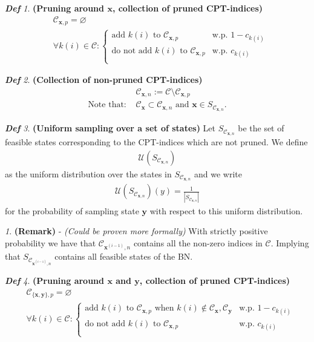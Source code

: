 \documentclass{amsart}
\theoremstyle{plain}
\theoremstyle{remark}
\newtheorem*{remark*}{}
\newtheorem*{definition*}{\textbf{\em Def}}
\theoremstyle{plain}
\newcommand{\C}{{\mathcal C}}
\newcommand{\U}{{\mathcal{U}}}
\newcommand{\bfx}{{\mathbf{x}}}
\newcommand{\bfy}{{\mathbf{y}}}
\let\emptyset\varnothing
\newcommand{\vs}{\vspace{0.75pc}}
\begin{document}
\begin{definition*}\textbf{ (Pruning around $\bfx$, collection of pruned CPT-indices) }
\begin{align*}
&\C_{\bfx,p} = \emptyset\\
& \forall k(i) \in \C:
\begin{cases}
\text{add $k(i)$ to $\C_{\bfx, p}$} & \text{w.p. $1-c_{k(i)}$}\\
\text{do not add $k(i)$ to $\C_{\bfx, p}$} & \text{w.p. $c_{k(i)}$}\\
\end{cases}
\end{align*}
\end{definition*}\vs 

\begin{definition*}\textbf{ (Collection of non-pruned CPT-indices) }
\begin{align*}
&\C_{\bfx,n}:=\C \setminus \C_{\bfx,p}\\
\text{Note that: } &\C_\bfx \subset \C_{\bfx,n} \text{ and } \bfx \in S_{\C_{\bfx,n}}.
\end{align*}
\end{definition*}\vs 

\begin{definition*}\textbf{ (Uniform sampling over a set of states) }
Let $S_{\C_{\bfx,n}}$ be the set of feasible states corresponding to the CPT-indices which are not pruned. We define
\begin{align*}
\U(S_{\C_{\bfx,n}})
\end{align*}
as the uniform distribution over the states in $S_{\C_{\bfx,n}}$ and we write
\begin{align*}
\U(S_{\C_{\bfx,n}})(y) = \frac{1}{|S_{\C_{\bfx,n}}|}
\end{align*}
for the probability of sampling state $\bfy$ with respect to this uniform distribution.
\end{definition*}\vs 

\begin{remark*}\textbf{ (Remark) } - \textit{ (Could be proven more formally) }
With strictly positive probability we have that $\C_{\bfx^{(i-1)},n}$ contains all the non-zero indices in $\C$. Implying that $S_{\C_{\bfx^{(i-1)},n}}$ contains all feasible states of the BN.
\end{remark*}\vs

\begin{definition*}\textbf{ (Pruning around $\bfx$ and $\bfy$, collection of pruned CPT-indices) }
\begin{align*}
&\C_{\{\bfx,\bfy\},p} = \emptyset\\
& \forall k(i) \in \C:
\begin{cases}
\text{add $k(i)$ to $\C_{\bfx, p}$ when $k(i) \notin \C_\bfx, \C_\bfy$}  & \text{w.p. $1-c_{k(i)}$}\\
\text{do not add $k(i)$ to $\C_{\bfx, p}$} & \text{w.p. $c_{k(i)}$}\\
\end{cases}
\end{align*}
\end{definition*}\vs 
\end{document}
